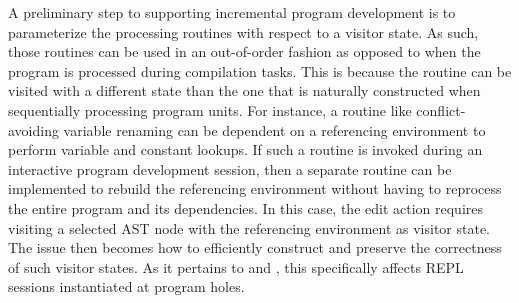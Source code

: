 
A preliminary step to supporting incremental program development is to parameterize the processing routines with respect to a visitor state.
As such, those routines can be used in an out-of-order fashion as opposed to when the program is processed during compilation tasks.
This is because the routine can be visited with a different state than the one that is naturally constructed when sequentially processing program units.
For instance, a routine like conflict-avoiding variable renaming can be dependent on a referencing environment to perform variable and constant lookups.
If such a routine is invoked during an interactive program development session, then a separate routine can be implemented to rebuild the referencing environment without having to reprocess the entire program and its dependencies.
In this case, the edit action requires visiting a selected \ac{AST} node with the referencing environment as visitor state.
The issue then becomes how to efficiently construct and preserve the correctness of such visitor states.
As it pertains to \Beluga and \Harpoon, this specifically affects \ac{REPL} sessions instantiated at program holes.
